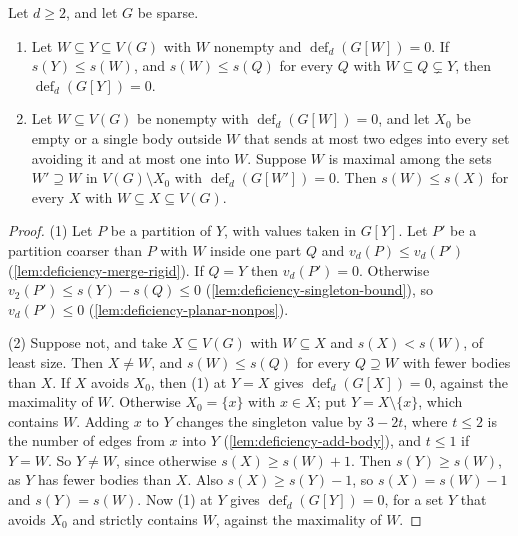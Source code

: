 \begin{lemma}
  \label{lem:deficiency-core-bound-d}
  \leanok
  Let $d \ge 2$, and let $G$ be sparse.
  \begin{enumerate}
    \item Let $W \subseteq Y \subseteq V(G)$ with $W$ nonempty and
      $\operatorname{def}_d(G[W]) = 0$. If $s(Y) \le s(W)$, and
      $s(W) \le s(Q)$ for every $Q$ with $W \subseteq Q \subsetneq Y$,
      then $\operatorname{def}_d(G[Y]) = 0$.
    \item Let $W \subseteq V(G)$ be nonempty with
      $\operatorname{def}_d(G[W]) = 0$, and let $X_0$ be empty or a
      single body outside $W$ that sends at most two edges into every
      set avoiding it and at most one into $W$. Suppose $W$ is maximal
      among the sets $W' \supseteq W$ in $V(G) \setminus X_0$ with
      $\operatorname{def}_d(G[W']) = 0$. Then $s(W) \le s(X)$ for every
      $X$ with $W \subseteq X \subseteq V(G)$.
  \end{enumerate}
\end{lemma}
\begin{proof}
  \leanok
  (1) Let $P$ be a partition of $Y$, with values taken in $G[Y]$. Let
  $P'$ be a partition coarser than $P$ with $W$ inside one part $Q$ and
  $v_d(P) \le v_d(P')$ (\cref{lem:deficiency-merge-rigid}). If $Q = Y$
  then $v_d(P') = 0$. Otherwise $v_2(P') \le s(Y) - s(Q) \le 0$
  (\cref{lem:deficiency-singleton-bound}), so $v_d(P') \le 0$
  (\cref{lem:deficiency-planar-nonpos}).

  (2) Suppose not, and take $X \subseteq V(G)$ with $W \subseteq X$ and
  $s(X) < s(W)$, of least size. Then $X \ne W$, and $s(W) \le s(Q)$ for
  every $Q \supseteq W$ with fewer bodies than $X$. If $X$ avoids $X_0$,
  then (1) at $Y = X$ gives $\operatorname{def}_d(G[X]) = 0$, against
  the maximality of $W$. Otherwise $X_0 = \{x\}$ with $x \in X$; put
  $Y = X \setminus \{x\}$, which contains $W$. Adding $x$ to $Y$ changes
  the singleton value by $3 - 2t$, where $t \le 2$ is the number of edges
  from $x$ into $Y$ (\cref{lem:deficiency-add-body}), and $t \le 1$ if
  $Y = W$. So $Y \ne W$, since otherwise $s(X) \ge s(W) + 1$. Then
  $s(Y) \ge s(W)$, as $Y$ has fewer bodies than $X$. Also
  $s(X) \ge s(Y) - 1$, so $s(X) = s(W) - 1$ and $s(Y) = s(W)$. Now (1)
  at $Y$ gives $\operatorname{def}_d(G[Y]) = 0$, for a set $Y$ that
  avoids $X_0$ and strictly contains $W$, against the maximality of
  $W$.
\end{proof}


